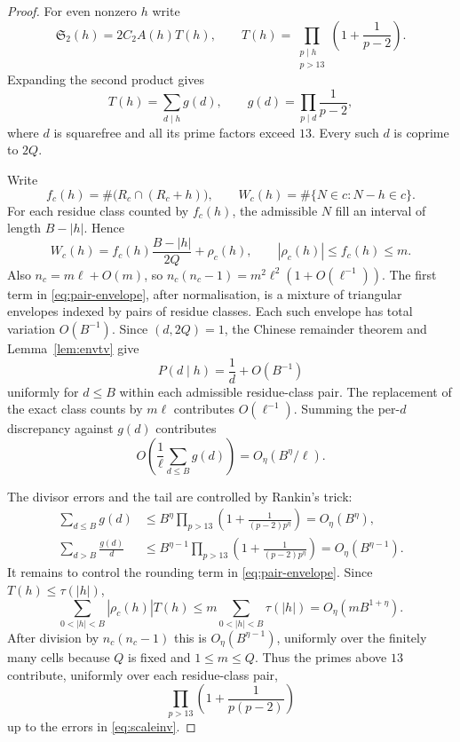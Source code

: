 \documentclass[11pt,a4paper]{article}
\theoremstyle{plain}
\theoremstyle{definition}
\theoremstyle{remark}
\renewcommand{\SS}{\mathfrak{S}}
\begin{document}
\begin{proof}
For even nonzero $h$ write
\[
 \SS_2(h)=2C_2A(h)T(h),\qquad
 T(h)=\prod_{\substack{p\mid h\\p>13}}
       \left(1+\frac1{p-2}\right).
\]
Expanding the second product gives
\[
 T(h)=\sum_{d\mid h}g(d),\qquad
 g(d)=\prod_{p\mid d}\frac1{p-2},
\]
where $d$ is squarefree and all its prime factors exceed $13$.
Every such $d$ is coprime to $2Q$.

Write
\[
 f_c(h)=\#\bigl(R_c\cap(R_c+h)\bigr),
 \qquad
 W_c(h)=\#\{N\in c:N-h\in c\}.
\]
For each residue class counted by $f_c(h)$, the admissible $N$ fill an
interval of length $B-|h|$.  Hence
\begin{equation}\label{eq:pair-envelope}
 W_c(h)=f_c(h)\frac{B-|h|}{2Q}+\rho_c(h),
 \qquad |\rho_c(h)|\leq f_c(h)\leq m.
\end{equation}
Also $n_c=m\ell+O(m)$, so
$n_c(n_c-1)=m^2\ell^2(1+O(\ell^{-1}))$.  The first term in
\eqref{eq:pair-envelope}, after normalisation, is a mixture of triangular
envelopes indexed by pairs of residue classes.  Each such envelope has
total variation $O(B^{-1})$.  Since $(d,2Q)=1$, the Chinese remainder
theorem and Lemma~\ref{lem:envtv} give
\[
 P(d\mid h)=\frac1d+O(B^{-1})
\]
uniformly for $d\leq B$ within each admissible residue-class pair.  The
replacement of the exact class counts by $m\ell$ contributes
$O(\ell^{-1})$.  Summing the per-$d$ discrepancy against $g(d)$
contributes
\[
 O\!\left(\frac1\ell\sum_{d\leq B}g(d)\right)
 =O_\eta(B^\eta/\ell).
\]

The divisor errors and the tail are controlled by Rankin's trick:
\[
\begin{aligned}
 \sum_{d\leq B}g(d)
 &\leq B^\eta
   \prod_{p>13}\left(1+\frac1{(p-2)p^\eta}\right)
   =O_\eta(B^\eta),\\
 \sum_{d>B}\frac{g(d)}d
 &\leq B^{\eta-1}
   \prod_{p>13}\left(1+\frac1{(p-2)p^\eta}\right)
   =O_\eta(B^{\eta-1}).
\end{aligned}
\]
It remains to control the rounding term in
\eqref{eq:pair-envelope}.  Since $T(h)\leq\tau(|h|)$,
\[
 \sum_{0<|h|<B}|\rho_c(h)|T(h)
 \leq m\sum_{0<|h|<B}\tau(|h|)
 =O_\eta(mB^{1+\eta}).
\]
After division by $n_c(n_c-1)$ this is
$O_\eta(B^{\eta-1})$, uniformly over the finitely many cells because
$Q$ is fixed and $1\leq m\leq Q$.  Thus the primes above $13$
contribute, uniformly over each residue-class pair,
\[
 \prod_{p>13}\left(1+\frac1{p(p-2)}\right)
\]
up to the errors in \eqref{eq:scaleinv}.


\end{proof}
\end{document}
